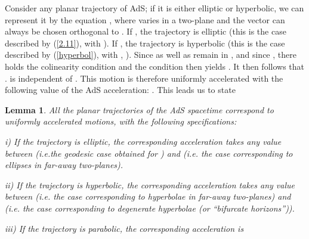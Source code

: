 \documentclass[a4paper,a4paper]{article}
\newtheorem{lemma}{Lemma}[section]
\begin{document}
Consider any planar trajectory of AdS; if it is either elliptic
or hyperbolic, we can represent it by the equation
\coordHE{}, where \coordHE{} varies in a two-plane \myHighlight{$\Pi$}\coordHE{}
and the vector \coordHE{} can always be chosen orthogonal to \myHighlight{$\Pi$}\coordHE{}.
If \coordHE{}, the trajectory is
elliptic (this is the case described by (\ref{2.11}), with
\coordHE{}).  If \coordHE{}, the trajectory is hyperbolic
(this is the case described by (\ref{hyperbol}), with
\coordHE{}, \coordHE{}).
Since \coordHE{} as well as \coordHE{} remain in \myHighlight{$\Pi$}\coordHE{}, and since
\coordHE{} , there holds the colinearity
condition \coordHE{} and the condition
\coordHE{} then yields
\coordHE{}.
It then follows that
\coordHE{}.
is independent of \coordHE{}. This motion is therefore uniformly
accelerated with the following value of the AdS acceleration:
\coordHE{}.
This leads us to state

\begin{lemma}
All the planar trajectories of the AdS spacetime correspond to
uniformly accelerated motions, with the following specifications:

i) If the trajectory is elliptic, the corresponding acceleration
\coordHE{}
takes any value between \coordHE{}
(i.e.the geodesic case obtained for \coordHE{})
and \coordHE{} (i.e. the case
\coordHE{} corresponding to
ellipses in far-away two-planes).

ii) If the trajectory is hyperbolic, the corresponding acceleration
\coordHE{}
takes any value between
\coordHE{} (i.e. the case
\coordHE{} corresponding to
hyperbolae in far-away two-planes)
and \myHighlight{$+\infty$}\coordHE{}
(i.e. the case \coordHE{} corresponding to
degenerate hyperbolae (or ``bifurcate horizons'')).

iii) If the trajectory is parabolic, the corresponding acceleration is
\coordHE{}
\label{accel}
\end{lemma}
\end{document}
